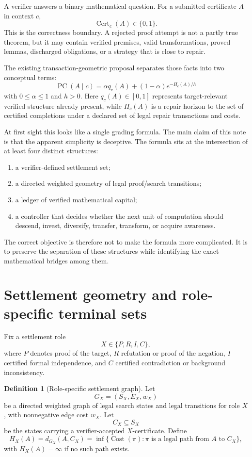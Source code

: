 \documentclass[11pt]{article}
\theoremstyle{definition}
\newtheorem{definition}[theorem]{Definition}
\theoremstyle{remark}
\newcommand{\PC}{\operatorname{PC}}
\newcommand{\Cert}{\operatorname{Cert}}
\newcommand{\Cost}{\operatorname{Cost}}
\begin{document}
A verifier answers a binary mathematical question. For a submitted certificate $A$ in context $c$,
\[
\Cert_c(A)\in\{0,1\}.
\]
This is the correctness boundary. A rejected proof attempt is not a partly true theorem, but it may contain verified premises, valid transformations, proved lemmas, discharged obligations, or a strategy that is close to repair.

The existing transaction-geometric proposal separates those facts into two conceptual terms:
\[
\boxed{
\PC(A\mid c)=\alpha q_c(A)+(1-\alpha)e^{-H_c(A)/h}
}
\]
with $0\le \alpha\le 1$ and $h>0$. Here $q_c(A)\in[0,1]$ represents target-relevant verified structure already present, while $H_c(A)$ is a repair horizon to the set of certified completions under a declared set of legal repair transactions and costs.

At first sight this looks like a single grading formula. The main claim of this note is that the apparent simplicity is deceptive. The formula sits at the intersection of at least four distinct structures:
\begin{enumerate}
\item a verifier-defined settlement set;
\item a directed weighted geometry of legal proof/search transitions;
\item a ledger of verified mathematical capital;
\item a controller that decides whether the next unit of computation should descend, invest, diversify, transfer, transform, or acquire awareness.
\end{enumerate}

The correct objective is therefore not to make the formula more complicated. It is to preserve the separation of these structures while identifying the exact mathematical bridges among them.

\section{Settlement geometry and role-specific terminal sets}

Fix a settlement role
\[
X\in\{P,R,I,C\},
\]
where $P$ denotes proof of the target, $R$ refutation or proof of the negation, $I$ certified formal independence, and $C$ certified contradiction or background inconsistency.

\begin{definition}[Role-specific settlement graph]
Let
\[
G_X=(S_X,E_X,w_X)
\]
be a directed weighted graph of legal search states and legal transitions for role $X$, with nonnegative edge cost $w_X$. Let
\[
C_X\subseteq S_X
\]
be the states carrying a verifier-accepted $X$-certificate. Define
\[
H_X(A)=d_{G_X}(A,C_X)
=\inf\{\Cost(\pi):\pi\text{ is a legal path from }A\text{ to }C_X\},
\]
with $H_X(A)=\infty$ if no such path exists.
\end{definition}
\end{document}
